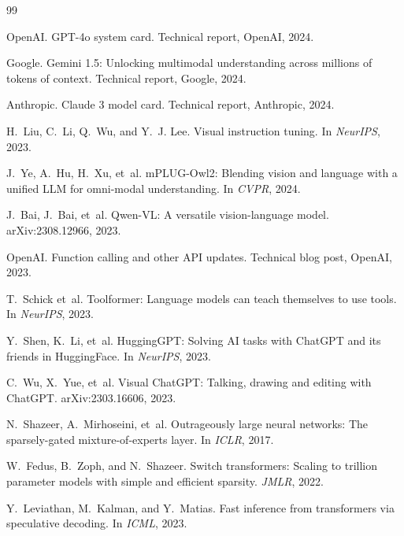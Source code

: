 \documentclass[11pt,a4paper]{article}
\begin{document}

\begin{thebibliography}{99}

OpenAI.
\newblock GPT-4o system card.
\newblock Technical report, OpenAI, 2024.

Google.
\newblock Gemini 1.5: Unlocking multimodal understanding across millions of tokens of context.
\newblock Technical report, Google, 2024.

Anthropic.
\newblock Claude 3 model card.
\newblock Technical report, Anthropic, 2024.

H.~Liu, C.~Li, Q.~Wu, and Y.~J. Lee.
\newblock Visual instruction tuning.
\newblock In \emph{NeurIPS}, 2023.

J.~Ye, A.~Hu, H.~Xu, et~al.
\newblock mPLUG-Owl2: Blending vision and language with a unified LLM for omni-modal understanding.
\newblock In \emph{CVPR}, 2024.

J.~Bai, J.~Bai, et~al.
\newblock Qwen-VL: A versatile vision-language model.
\newblock arXiv:2308.12966, 2023.

OpenAI.
\newblock Function calling and other API updates.
\newblock Technical blog post, OpenAI, 2023.

T.~Schick et~al.
\newblock Toolformer: Language models can teach themselves to use tools.
\newblock In \emph{NeurIPS}, 2023.

Y.~Shen, K.~Li, et~al.
\newblock HuggingGPT: Solving AI tasks with ChatGPT and its friends in HuggingFace.
\newblock In \emph{NeurIPS}, 2023.

C.~Wu, X.~Yue, et~al.
\newblock Visual ChatGPT: Talking, drawing and editing with ChatGPT.
\newblock arXiv:2303.16606, 2023.

N.~Shazeer, A.~Mirhoseini, et~al.
\newblock Outrageously large neural networks: The sparsely-gated
mixture-of-experts layer.
\newblock In \emph{ICLR}, 2017.

W.~Fedus, B.~Zoph, and N.~Shazeer.
\newblock Switch transformers: Scaling to trillion parameter models with
simple and efficient sparsity.
\newblock \emph{JMLR}, 2022.

Y.~Leviathan, M.~Kalman, and Y.~Matias.
\newblock Fast inference from transformers via speculative decoding.
\newblock In \emph{ICML}, 2023.


\end{thebibliography}
\end{document}

